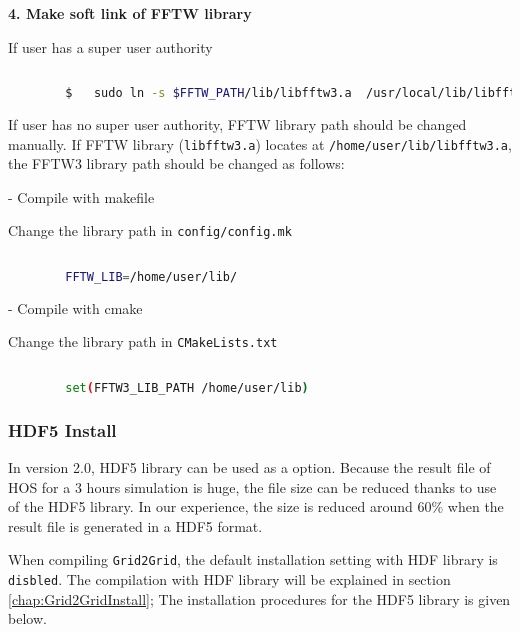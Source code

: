 		
		\vspace{0.5cm}
		\textbf{4. Make soft link of FFTW library }
		
		If user has a super user authority
		
		\begin{lstlisting}[language=bash]
		
		$	sudo ln -s $FFTW_PATH/lib/libfftw3.a  /usr/local/lib/libfftw3.a		
		\end{lstlisting}
				
		\vspace{0.5cm}
		
		If user has no super user authority, FFTW library path should be changed manually. If FFTW library (\texttt{libfftw3.a}) locates at \texttt{/home/user/lib/libfftw3.a}, the FFTW3 library path should be changed as follows: 
		
		- Compile with makefile
		
		Change the library path in \texttt{config/config.mk}
		
		\begin{lstlisting}[language=bash]
		
		FFTW_LIB=/home/user/lib/
		\end{lstlisting}

		- Compile with cmake		
		
		Change the library path in \texttt{CMakeLists.txt}		

		\begin{lstlisting}[language=bash]
		
		set(FFTW3_LIB_PATH /home/user/lib)
		\end{lstlisting}		
		
		\subsubsection{HDF5 Install}
		
		\label{chap:HDF5Install}
		
		In version 2.0, HDF5 library can be used as a option. Because the result file of HOS for a 3 hours simulation is huge, the file size can be reduced thanks to use of the HDF5 library. In our experience, the size is reduced around 60\% when the result file is generated in a HDF5 format. 
				
		When compiling \texttt{Grid2Grid}, the default installation setting with HDF library is \texttt{disbled}. The compilation with HDF library will be explained in section \ref{chap:Grid2GridInstall}; The installation procedures for the HDF5 library is given below. 		
				
